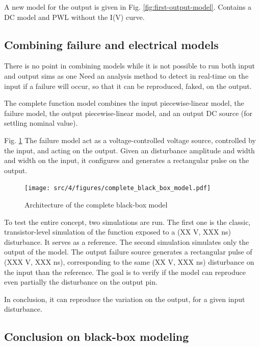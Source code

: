 A new model for the output is given in Fig. \ref{fig:first-output-model}.
Contains a DC model and PWL without the I(V) curve.

\subsection{Combining failure and electrical models}

There is no point in combining models while it is not possible to run both input and output sims as one
Need an analysis method to detect in real-time on the input if a failure will occur, so that it can be reproduced, faked, on the output.

The complete function model combines the input piecewise-linear model, the failure model, the output piecewise-linear model, and an output DC source (for settling nominal value).

Fig. \ref{fig:complete-black-box-model}
The failure model act as a voltage-controlled voltage source, controlled by the input, and acting on the output.
Given an disturbance amplitude and width and width on the input, it configures and generates a rectangular pulse on the output.

\begin{figure}[!h]
  \centering
  \texttt{[image: src/4/figures/complete\_black\_box\_model.pdf]}
  \caption{Architecture of the complete black-box model}
  \label{fig:complete-black-box-model}
\end{figure}

To test the entire concept, two simulations are run.
The first one is the classic, transistor-level simulation of the function exposed to a (XX V, XXX ns) disturbance.
It serves as a reference.
The second simulation simulates only the output of the model.
The output failure source generates a rectangular pulse of (XXX V, XXX ns), corresponding to the same (XX V, XXX ns) disturbance on the input than the reference.
The goal is to verify if the model can reproduce even partially the disturbance on the output pin.


In conclusion, it can reproduce the variation on the output, for a given input disturbance.

\subsection{Conclusion on black-box modeling}

